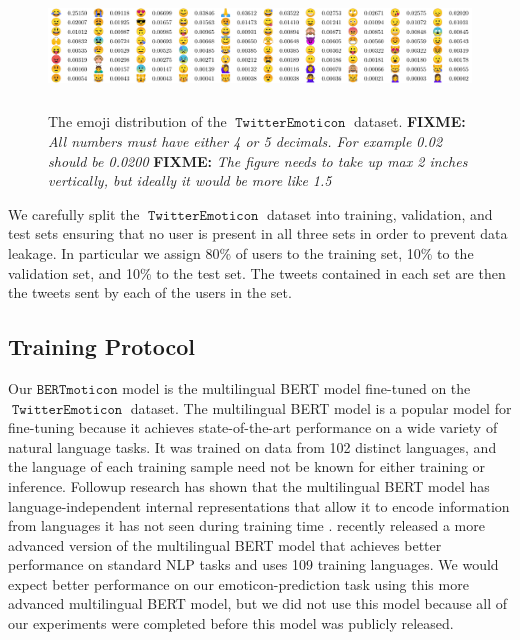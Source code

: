 \documentclass[11pt]{article}
\newcommand{\fixme}[1]{{\color{red} \textbf{FIXME:} {\textit {#1}}}}
\newcommand{\bertmoji}{\texttt{BERTmoticon}}
\DeclareMathOperator{\emoticon}{\texttt{TwitterEmoticon}}
\begin{document}
\begin{figure}
    \centering
    \includegraphics[width = \textwidth,height=1.3in]{images/emoji_table_fix.pdf}
    \caption{
        The emoji distribution of the $\emoticon$ dataset.
        \fixme{All numbers must have either 4 or 5 decimals.  For example 0.02 should be 0.0200}
        \fixme{The figure needs to take up max 2 inches vertically, but ideally it would be more like 1.5}
    } 
    \label{fig:stats:emoticon}
\end{figure}

We carefully split the $\emoticon$ dataset into training, validation, and test sets ensuring that no user is present in all three sets in order to prevent data leakage.
In particular we assign 80\% of users to the training set, 10\% to the validation set, and 10\% to the test set.
The tweets contained in each set are then the tweets sent by each of the users in the set.


\subsection{Training Protocol}

Our $\bertmoji$ model is the multilingual BERT model \citep{devlin2018bert} fine-tuned on the $\emoticon$ dataset.
The multilingual BERT model is a popular model for fine-tuning because it achieves state-of-the-art performance on a wide variety of natural language tasks.
It was trained on data from 102 distinct languages,
and the language of each training sample need not be known for either training or inference.
Followup research has shown that the multilingual BERT model has language-independent internal representations that allow it to encode information from languages it has not seen during training time \citep{pires2019multilingual,wu2019emerging}.
\citet{feng2020language} recently released a more advanced version of the multilingual BERT model that achieves better performance on standard NLP tasks and uses 109 training languages.
We would expect better performance on our emoticon-prediction task using this more advanced multilingual BERT model,
but we did not use this model because all of our experiments were completed before this model was publicly released.
\end{document}
